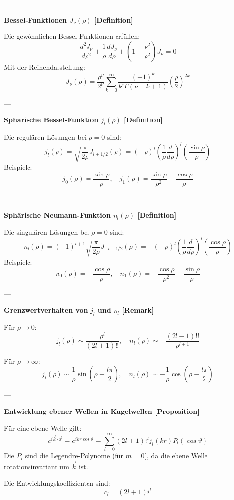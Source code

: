 \documentclass[10pt, letterpaper]{article}
\begin{document}
---

\textbf{Bessel-Funktionen $J_\nu(\rho)$ [Definition]}

Die gewöhnlichen Bessel-Funktionen erfüllen:
\[
\frac{d^2 J_\nu}{d\rho^2} + \frac{1}{\rho} \frac{d J_\nu}{d\rho} + \left(1 - \frac{\nu^2}{\rho^2} \right) J_\nu = 0
\]
Mit der Reihendarstellung:
\[
J_\nu(\rho) = \frac{\rho^\nu}{2^\nu} \sum_{k=0}^\infty \frac{(-1)^k}{k! \Gamma(\nu + k + 1)} \left( \frac{\rho}{2} \right)^{2k}
\]

---

\textbf{Sphärische Bessel-Funktion $j_l(\rho)$ [Definition]}

Die regulären Lösungen bei $\rho = 0$ sind:
\[
j_l(\rho) = \sqrt{\frac{\pi}{2\rho}} J_{l + 1/2}(\rho) = (-\rho)^l \left( \frac{1}{\rho} \frac{d}{d\rho} \right)^l \left( \frac{\sin \rho}{\rho} \right)
\]
Beispiele:
\[
j_0(\rho) = \frac{\sin \rho}{\rho}, \quad j_1(\rho) = \frac{\sin \rho}{\rho^2} - \frac{\cos \rho}{\rho}
\]

---

\textbf{Sphärische Neumann-Funktion $n_l(\rho)$ [Definition]}

Die singulären Lösungen bei $\rho = 0$ sind:
\[
n_l(\rho) = (-1)^{l+1} \sqrt{\frac{\pi}{2\rho}} J_{-l - 1/2}(\rho) = -(-\rho)^l \left( \frac{1}{\rho} \frac{d}{d\rho} \right)^l \left( \frac{\cos \rho}{\rho} \right)
\]
Beispiele:
\[
n_0(\rho) = -\frac{\cos \rho}{\rho}, \quad n_1(\rho) = -\frac{\cos \rho}{\rho^2} - \frac{\sin \rho}{\rho}
\]

---

\textbf{Grenzwertverhalten von $j_l$ und $n_l$ [Remark]}

Für $\rho \to 0$:
\[
j_l(\rho) \sim \frac{\rho^l}{(2l + 1)!!}, \quad n_l(\rho) \sim -\frac{(2l - 1)!!}{\rho^{l+1}}
\]

Für $\rho \to \infty$:
\[
j_l(\rho) \sim \frac{1}{\rho} \sin \left( \rho - \frac{l\pi}{2} \right), \quad n_l(\rho) \sim -\frac{1}{\rho} \cos \left( \rho - \frac{l\pi}{2} \right)
\]

---

\textbf{Entwicklung ebener Wellen in Kugelwellen [Proposition]}

Für eine ebene Welle gilt:
\[
e^{i \vec{k} \cdot \vec{x}} = e^{i k r \cos \vartheta} = \sum_{l=0}^\infty (2l + 1) i^l j_l(kr) P_l(\cos \vartheta)
\]
Die $P_l$ sind die Legendre-Polynome (für $m=0$), da die ebene Welle rotationsinvariant um $\vec{k}$ ist.

Die Entwicklungskoeffizienten sind:
\[
c_l = (2l + 1) i^l
\]
\end{document}
